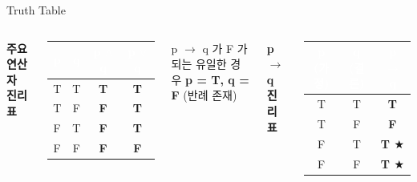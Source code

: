 \documentclass[10.5pt,compress]{beamer}
\newcommand{\Tcell}{\cellcolor{lightgreen!80}\textcolor{codegreen}{\textbf{T}}}
\newcommand{\Fcell}{\cellcolor{lightred!80}\textcolor{codered}{\textbf{F}}}
\newcommand{\Tvac}{\cellcolor{lightamber!80}\textcolor{amber}{\textbf{T $\bigstar$}}}
\begin{document}
\begin{frame}[t]{Truth Table}
    \footnotesize
    \vspace{0.15cm}
    \begin{columns}[T]
        \textbf{주요 연산자 진리표}
        \vspace{0.08cm}

        \scriptsize
        \renewcommand{\arraystretch}{1.4}
        \begin{tabular}{|c|c|c|c|}
            \hline
            \rowcolor{navyblue}\textcolor{white}{\textbf{p}} &
            \textcolor{white}{\textbf{q}} &
            \textcolor{white}{\textbf{p $\land$ q}} &
            \textcolor{white}{\textbf{p $\lor$ q}} \\
            \hline
            T & T & \Tcell & \Tcell \\
            \hline
            T & F & \Fcell & \Tcell \\
            \hline
            F & T & \Fcell & \Tcell \\
            \hline
            F & F & \Fcell & \Fcell \\
            \hline
        \end{tabular}
        \renewcommand{\arraystretch}{1}

        \vspace{0.25cm}
        \begin{alertblock}{\scriptsize p $\rightarrow$ q 가 F 가 되는 유일한 경우}
            \footnotesize \textbf{p = T, q = F} \quad (반례 존재)
        \end{alertblock}

        \textbf{p $\rightarrow$ q 진리표}
        \vspace{0.08cm}

        \scriptsize
        \renewcommand{\arraystretch}{1.4}
        \begin{tabular}{|c|c|c|}
            \hline
            \rowcolor{navyblue}\textcolor{white}{\textbf{p (가정)}} &
            \textcolor{white}{\textbf{q (결론)}} &
            \textcolor{white}{\textbf{p $\rightarrow$ q}} \\
            \hline
            T & T & \Tcell \\
            \hline
            T & F & \Fcell \\
            \hline
            \cellcolor{lightamber!60}F & \cellcolor{lightamber!60}T & \Tvac \\
            \hline
            \cellcolor{lightamber!60}F & \cellcolor{lightamber!60}F & \Tvac \\
            \hline
        \end{tabular}
        \renewcommand{\arraystretch}{1}


\end{columns}
\end{frame}
\end{document}
